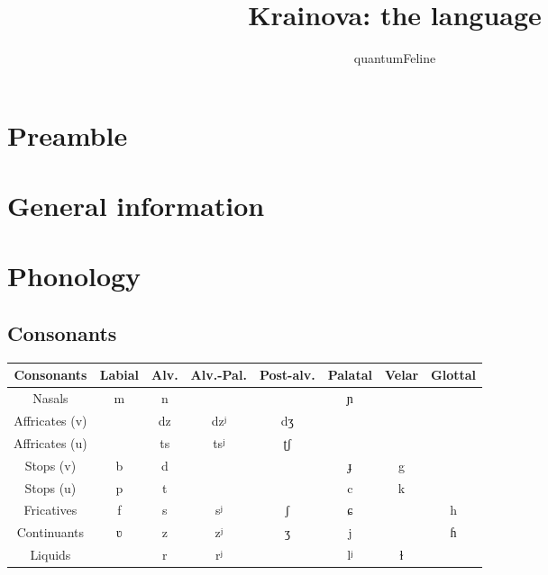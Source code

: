 \documentclass[12pt]{article}
\begin{document}
	\title{Krainova: the language}
	\author{quantumFeline}
	\maketitle

	\section{Preamble}

	\tableofcontents

	\section{General information}
	
	

	\section{Phonology}

	\subsection{Consonants}

	\begin{tabular}{||c | c c c c c c c ||}
		\hline
		Consonants & Labial & Alv. & Alv.-Pal. &
		Post-alv. & Palatal & Velar & Glottal \\
		\hline
		Nasals & m & n & & & ɲ & & \\
		Affricates (v) & & dz &  dzʲ & dʒ & & & \\
		Affricates (u) & & ts & tsʲ & ʈʃ & & & \\
		Stops (v) & b & d & & & ɟ & g & \\
		Stops (u) & p & t & & & c & k & \\
		Fricatives & f & s & sʲ & ʃ & ɕ & & h \\
		Continuants & ʋ & z & zʲ & ʒ & j & & ɦ \\
		Liquids & & r & rʲ & & lʲ & ɫ & \\
		\hline
	\end{tabular}
	
	\begin{comment}
	\textasciitilde w
	\begin{tabular}{|| c | c | c | c | c | c | c | c ||}
	\hline
		& Labial & \multicolumn{2}{c|}{ Dental/ Alveolar} &
		Post-alv. & Palatal & Velar & Glottal \\
		& & Hard & Soft & & & & \\
	\hline
	
	Nasal & m & n & nʲ & & & & \\
	Affricates & & dz ts & dzʲ tsʲ & dʒ  ʈʃ & & & \\
	Stops & p b & d t & dʲ tʲ & & & g k & \\
	Fricatives & & z s & zʲ sʲ & ʒ  ʃ & ç & & h ɦ \\
	Approximants & ʋ & ɫ & lʲ & & j & & \\
	Trill & & r & rʲ & & & &\\
	\hline
	
	\end{tabular}
	\end{comment}
\end{document}
